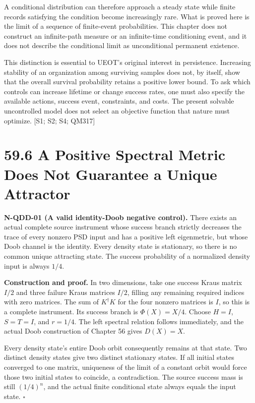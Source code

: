 \documentclass[
  11pt,
  oneside]{book}
\begin{document}
A conditional distribution can therefore approach a steady state while
finite records satisfying the condition become increasingly rare. What
is proved here is the limit of a sequence of finite-event probabilities.
This chapter does not construct an infinite-path measure or an
infinite-time conditioning event, and it does not describe the
conditional limit as unconditional permanent existence.

This distinction is essential to UEOT's original interest in
persistence. Increasing stability of an organization among surviving
samples does not, by itself, show that the overall survival probability
retains a positive lower bound. To ask which controls can increase
lifetime or change success rates, one must also specify the available
actions, success event, constraints, and costs. The present solvable
uncontrolled model does not select an objective function that nature
must optimize. {[}S1; S2; S4; QM317{]}

\section{59.6 A Positive Spectral Metric Does Not Guarantee a Unique
Attractor}

\label{n-qdd-01}{}

\textbf{N-QDD-01 (A valid identity-Doob negative control).} There exists
an actual complete source instrument whose success branch strictly
decreases the trace of every nonzero PSD input and has a positive left
eigenmetric, but whose Doob channel is the identity. Every density state
is stationary, so there is no common unique attracting state. The
success probability of a normalized density input is always \(1/4\).

\textbf{Construction and proof.} In two dimensions, take one success
Kraus matrix \(I/2\) and three failure Kraus matrices \(I/2\), filling
any remaining required indices with zero matrices. The sum of
\(K^\dagger K\) for the four nonzero matrices is \(I\), so this is a
complete instrument. Its success branch is \(\Phi(X)=X/4\). Choose
\(H=I\), \(S=T=I\), and \(r=1/4\). The left spectral relation follows
immediately, and the actual Doob construction of Chapter 56 gives
\(D(X)=X\).

Every density state's entire Doob orbit consequently remains at that
state. Two distinct density states give two distinct stationary states.
If all initial states converged to one matrix, uniqueness of the limit
of a constant orbit would force those two initial states to coincide, a
contradiction. The source success mass is still \((1/4)^n\), and the
actual finite conditional state always equals the input state.
\(\square\)
\end{document}
